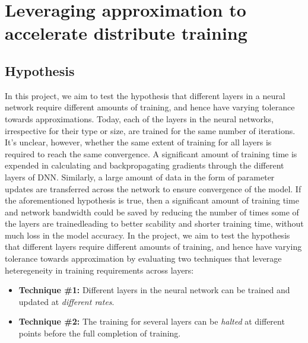 \section{Leveraging approximation to accelerate distribute training}
\subsection{Hypothesis}
In this project, we aim to test the hypothesis that different layers in a neural network require different amounts of training, and hence have varying tolerance towards approximations. Today, each of the layers in the neural networks, irrespective for their type or size, are trained for the same number of iterations. It's unclear, however, whether the same extent of training for all layers is required to reach the same convergence. A significant amount of training time is expended in calculating and backpropagating gradients through the different layers of DNN. Similarly, a large amount of data in the form of parameter updates are transferred across the network to ensure convergence of the model. If the aforementioned hypothesis is true, then a significant amount of training time and network bandwidth could be saved by reducing the number of times some of the layers are trained{\textemdash}leading to better scability and shorter training time, without much loss in the model accuracy. In the project, we aim to test the hypothesis that different layers require different amounts of training, and hence have varying tolerance towards approximation by evaluating two techniques that leverage heteregeneity in training requirements across layers:     
\begin{itemize}
\item \textbf{Technique \#1:} Different layers in the neural network can be trained and updated at \emph{different rates}.
\item \textbf{Technique \#2:} The training for several layers can be \emph{halted} at different points before the full completion of training. 
\end{itemize}
